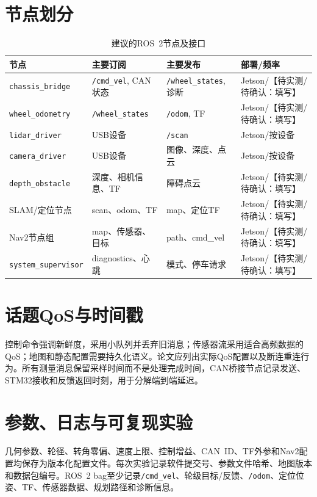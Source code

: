 \documentclass[UTF8,openany,12pt,a4paper]{ctexrep}
\newcommand{\placeholder}[1]{\textcolor{red!70!black}{【待实测/待确认：#1】}}
\begin{document}
\section{节点划分}
\begin{table}[H]\centering
\caption{建议的ROS~2节点及接口}
\begin{tabular}{p{3.2cm}p{3.5cm}p{4.2cm}p{3.0cm}}
\toprule 节点 & 主要订阅 & 主要发布 & 部署/频率\\ \midrule
\texttt{chassis\_bridge} & \texttt{/cmd\_vel}, CAN状态 & \texttt{/wheel\_states},诊断 & Jetson/\placeholder{填写}\\
\texttt{wheel\_odometry} & \texttt{/wheel\_states} & \texttt{/odom}, TF & Jetson/\placeholder{填写}\\
\texttt{lidar\_driver} & USB设备 & \texttt{/scan} & Jetson/按设备\\
\texttt{camera\_driver} & USB设备 & 图像、深度、点云 & Jetson/按设备\\
\texttt{depth\_obstacle} & 深度、相机信息、TF & 障碍点云 & Jetson/\placeholder{填写}\\
SLAM/定位节点 & scan、odom、TF & map、定位TF & Jetson/\placeholder{填写}\\
Nav2节点组 & map、传感器、目标 & path、cmd\_vel & Jetson/\placeholder{填写}\\
\texttt{system\_supervisor} & diagnostics、心跳 & 模式、停车请求 & Jetson/\placeholder{填写}\\ \bottomrule
\end{tabular}
\end{table}

\section{话题QoS与时间戳}
控制命令强调新鲜度，采用小队列并丢弃旧消息；传感器流采用适合高频数据的QoS；地图和静态配置需要持久化语义。论文应列出实际QoS配置以及断连重连行为。所有测量消息保留采样时间而不是处理完成时间，CAN桥接节点记录发送、STM32接收和反馈返回时刻，用于分解端到端延迟。

\section{参数、日志与可复现实验}
几何参数、轮径、转角零偏、速度上限、控制增益、CAN~ID、TF外参和Nav2配置均保存为版本化配置文件。每次实验记录软件提交号、参数文件哈希、地图版本和数据包编号。ROS~2 bag至少记录\texttt{/cmd\_vel}、轮级目标/反馈、\texttt{/odom}、定位位姿、TF、传感器数据、规划路径和诊断信息。
\end{document}
